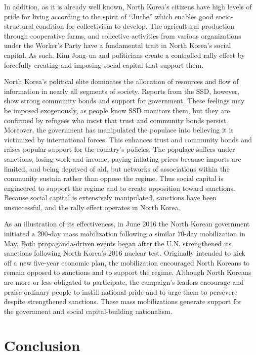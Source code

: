 \documentclass[
  english,
  man]{apa6}
\begin{document}
In addition, as it is already well known, North Korea's citizens have high levels of pride for living according to the spirit of ``Juche'' which enables good socio-structural condition for collectivism to develop. The agricultural production through cooperative farms, and collective activities from various organizations under the Worker's Party have a fundamental trait in North Korea's social capital. As such, Kim Jong-un and politicians create a controlled rally effect by forcefully creating and imposing social capital that support them.

North Korea's political elite dominates the allocation of resources and flow of information in nearly all segments of society. Reports from the SSD, however, show strong community bonds and support for government. These feelings may be imposed exogenously, as people know SSD monitors them, but they are confirmed by refugees who insist that trust and community bonds persist. Moreover, the government has manipulated the populace into believing it is victimized by international forces. This enhances trust and community bonds and raises popular support for the country's policies. The populace suffers under sanctions, losing work and income, paying inflating prices because imports are limited, and being deprived of aid, but networks of associations within the community sustain rather than oppose the regime. Thus social capital is engineered to support the regime and to create opposition toward sanctions. Because social capital is extensively manipulated, sanctions have been unsuccessful, and the rally effect operates in North Korea.

As an illustration of its effectiveness, in June 2016 the North Korean government initiated a 200-day mass mobilization following a similar 70-day mobilization in May. Both propaganda-driven events began after the U.N. strengthened its sanctions following North Korea's 2016 nuclear test. Originally intended to kick off a new five-year economic plan, the mobilization encouraged North Koreans to remain opposed to sanctions and to support the regime. Although North Koreans are more or less obligated to participate, the campaign's leaders encourage and praise ordinary people to instill national pride and to urge them to persevere despite strengthened sanctions. These mass mobilizations generate support for the government and social capital-building nationalism.

\hypertarget{conclusion}{%
\section{Conclusion}\label{conclusion}}
\end{document}
